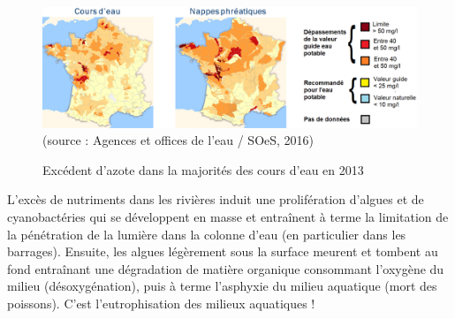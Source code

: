 \documentclass[../thesis.tex]{subfiles}
\begin{document}
    
    
    
    \vfill
    \begin{figure}[H]
        \centering
        \includegraphics[width=\linewidth]{img/intro/intro-carte-azote-2}
        {\scriptsize (source : Agences et offices de l'eau / SOeS, 2016) }
        \caption{Excédent d'azote dans la majorités des cours d'eau en 2013}
        \label{fig:02-intro-carte-azote}
    \end{figure}
    \vfill
    
    \par L'excès de nutriments dans les rivières induit une prolifération d'algues et de cyanobactéries qui se développent en masse et entraînent à terme la limitation de la pénétration de la lumière dans la colonne d'eau (en particulier dans les barrages). Ensuite, les algues légèrement sous la surface meurent et tombent au fond entraînant une dégradation de matière organique consommant l'oxygène du milieu (désoxygénation), puis à terme l'asphyxie du milieu aquatique (mort des poissons). C'est l'eutrophisation des milieux aquatiques ! 
    
\end{document}

